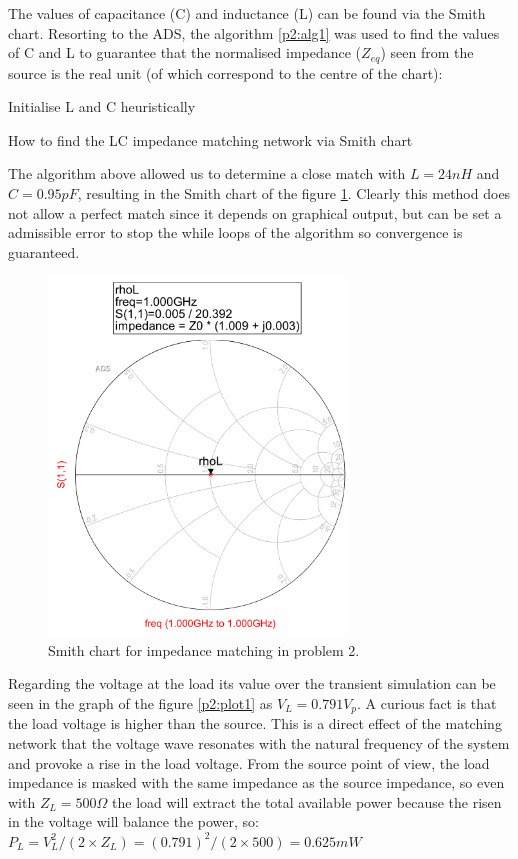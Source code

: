 The values of capacitance (C) and inductance (L) can be found via the Smith chart. Resorting to the ADS, the algorithm \ref{p2:alg1} was used to find the values of C and L to guarantee that the normalised impedance ($Z_{eq}$) seen from the source is the real unit (of which correspond to the centre of the chart):
\newline
\begin{algorithm}[H]
\SetAlgoLined
{}
 Initialise L and C heuristically\;
 \caption{How to find the LC impedance matching network via Smith chart}
 \label{p2:alg1}
\end{algorithm}


The algorithm above allowed us to determine a close match with $L=24 nH$ and $C=0.95 pF$, resulting in the Smith chart of the figure \ref{p2:smith1}. Clearly this method does not allow a perfect match since it depends on graphical output, but can be set a admissible error to stop the while loops of the algorithm so convergence is guaranteed.

\begin{figure}[H] 
\centering
\includegraphics[width=8cm]{images/smith4.png}
\caption{Smith chart for impedance matching in problem 2.}
\label{p2:smith1} 
\end{figure}

Regarding the voltage at the load its value over the transient simulation can be seen in the graph of the figure \ref{p2:plot1} as $V_L = 0.791 V_p$. A curious fact is that the load voltage is higher than the source. This is a direct effect of the matching network that the voltage wave resonates with the natural frequency of the system and provoke a rise in the load voltage. From the source point of view, the load impedance is masked with the same impedance as the source impedance, so even with $Z_L = 500 \Omega$ the load  will extract the total available power because the risen in the voltage will balance the power, so: $P_L = V_L^2/(2 \times Z_L) = (0.791)^2/(2 \times 500) = 0.625mW$

